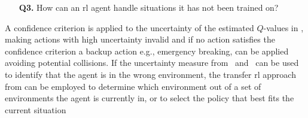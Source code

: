 \begin{enumerate}
	\item[\textbf{Q3.}] How can an \gls{rl} agent handle situations it has not been trained on? 
\end{enumerate}
A confidence criterion is applied to the uncertainty of the estimated $Q$-values in \paperEnsamble, making actions with high uncertainty invalid and if no action satisfies the confidence criterion a backup action e.g., emergency breaking, can be applied avoiding potential collisions. If the uncertainty measure from \paperEnsamble \ and \paperBelief \ can be used to identify that the agent is in the wrong environment, the transfer \gls{rl} approach from \paperTransfer can be employed to determine which environment out of a set of environments the agent is currently in, or to select the policy that best fits the current situation



	
